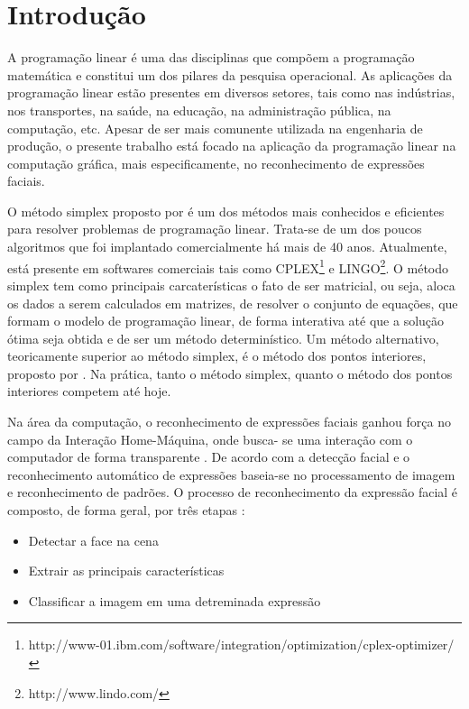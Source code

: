 \chapter{Introdução}

A programação linear é uma das disciplinas que compõem a programação matemática e constitui um dos pilares da pesquisa operacional. As aplicações da programação linear estão presentes em diversos setores, tais como nas indústrias, nos transportes, na saúde, na educação, na administração pública, na computação, etc. Apesar de ser mais comunente utilizada na engenharia de produção, o presente trabalho está focado na aplicação da programação linear na computação gráfica, mais especificamente, no reconhecimento de expressões faciais.

O método simplex proposto por  é um dos métodos mais conhecidos e eficientes para resolver problemas de programação linear. Trata-se de um dos poucos algoritmos que foi implantado comercialmente há mais de 40 anos. Atualmente, está presente em softwares comerciais tais como CPLEX\footnote{http://www-01.ibm.com/software/integration/optimization/cplex-optimizer/} e LINGO\footnote{http://www.lindo.com/}. O método simplex tem como principais carcaterísticas o fato de ser matricial, ou seja, aloca os dados a serem calculados em matrizes, de resolver o conjunto de equações, que formam o modelo de programação linear, de forma interativa até que a solução ótima seja obtida e de ser um método determinístico. Um método alternativo, teoricamente superior ao método simplex, é o método dos pontos interiores, proposto por . Na prática, tanto o método simplex, quanto o método dos pontos interiores competem até hoje.  

Na área da computação, o reconhecimento de expressões faciais ganhou força no campo da Interação Home-Máquina, onde busca- se uma interação com o computador de forma transparente \cite{Elizabeth}. De acordo com  a detecção facial e o reconhecimento automático de expressões baseia-se no processamento de imagem e reconhecimento de padrões. O processo de reconhecimento da expressão facial é composto, de forma geral, por três etapas \cite{Elizabeth}:\\
\begin{itemize}
\item Detectar a face na cena
\item Extrair as principais características
\item Classificar a imagem em uma detreminada expressão
\end{itemize}

